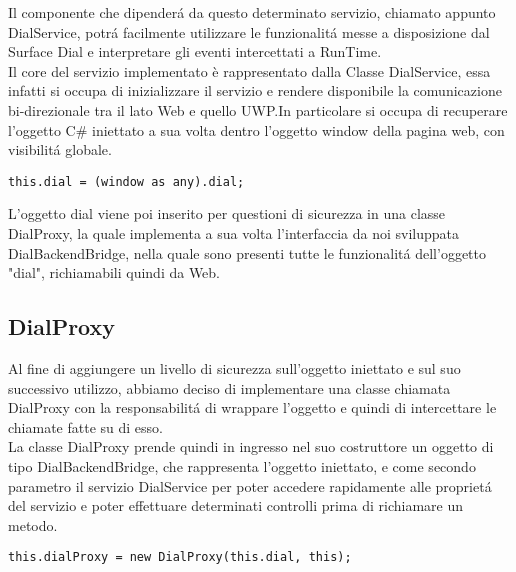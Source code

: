 Il componente che dipenderá da questo determinato servizio, chiamato appunto DialService, potrá facilmente utilizzare le funzionalitá messe a disposizione dal Surface Dial e interpretare gli eventi intercettati a RunTime.\\

Il core del servizio implementato è rappresentato dalla Classe DialService, essa infatti si occupa di inizializzare il servizio e rendere disponibile la comunicazione bi-direzionale tra il lato Web e quello UWP.In particolare si occupa di recuperare l'oggetto C\# iniettato a sua volta dentro l'oggetto window della pagina web, con visibilitá globale.\\

\vspace{1.0cm}
\begin{lstlisting}[caption={Recupero oggetto C\#},style=javaScriptCode]
	this.dial = (window as any).dial;
\end{lstlisting} 
\vspace{1.0cm}

L'oggetto dial viene poi inserito per questioni di sicurezza in una classe DialProxy, la quale implementa a sua volta l'interfaccia da noi sviluppata DialBackendBridge, nella quale sono presenti tutte le funzionalitá dell'oggetto "dial", richiamabili quindi da Web.

\subsection{DialProxy}

Al fine di aggiungere un livello di sicurezza sull’oggetto iniettato e sul suo successivo utilizzo, abbiamo deciso di implementare una classe chiamata DialProxy con la responsabilitá di wrappare l’oggetto e quindi di intercettare le chiamate fatte su di esso.\\

La classe DialProxy prende quindi in ingresso nel suo costruttore un oggetto di tipo DialBackendBridge, che rappresenta l'oggetto iniettato, e come secondo parametro il servizio DialService per poter accedere rapidamente alle proprietá del servizio e poter effettuare determinati controlli prima di richiamare un metodo.\\

\vspace{1.0cm}
\begin{lstlisting}[caption={Wrapping oggetto recuperato},style=javaScriptCode]
	this.dialProxy = new DialProxy(this.dial, this);
\end{lstlisting} 
\vspace{1.0cm}

